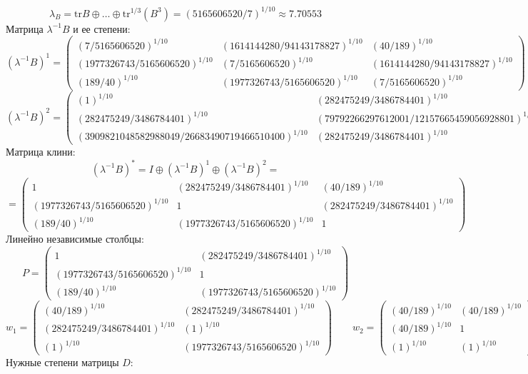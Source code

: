$$\lambda_{B} = \mathrm{tr}B\oplus \dots \oplus \mathrm{tr}^{1/3}(B^{3}) = (5165606520/7)^{1/10} \approx 7.70553$$
Матрица $\lambda^{-1}B$ и ее степени:
$$(\lambda^{-1}B)^1 = \begin{pmatrix}
(7/5165606520)^{1/10} & (1614144280/94143178827)^{1/10} & (40/189)^{1/10}\\
(1977326743/5165606520)^{1/10} & (7/5165606520)^{1/10} & (1614144280/94143178827)^{1/10}\\
(189/40)^{1/10} & (1977326743/5165606520)^{1/10} & (7/5165606520)^{1/10}
\end{pmatrix}
$$
$$(\lambda^{-1}B)^2 = \begin{pmatrix}
(1)^{1/10} & (282475249/3486784401)^{1/10} & (2605461756656718400/8862938119652501095929)^{1/10}\\
(282475249/3486784401)^{1/10} & (79792266297612001/12157665459056928801)^{1/10} & (282475249/3486784401)^{1/10}\\
(3909821048582988049/26683490719466510400)^{1/10} & (282475249/3486784401)^{1/10} & (1)^{1/10}
\end{pmatrix}
$$
Матрица клини:
$$(\lambda^{-1}B)^* = I \oplus (\lambda^{-1}B)^1 \oplus (\lambda^{-1}B)^2 = $$
$$ = \begin{pmatrix}
1 & (282475249/3486784401)^{1/10} & (40/189)^{1/10}\\
(1977326743/5165606520)^{1/10} & 1 & (282475249/3486784401)^{1/10}\\
(189/40)^{1/10} & (1977326743/5165606520)^{1/10} & 1
\end{pmatrix}
$$
Линейно независимые столбцы:
$$P = \begin{pmatrix}
1 & (282475249/3486784401)^{1/10}\\
(1977326743/5165606520)^{1/10} & 1\\
(189/40)^{1/10} & (1977326743/5165606520)^{1/10}
\end{pmatrix}
$$
$$w_1 = \begin{pmatrix}
(40/189)^{1/10} & (282475249/3486784401)^{1/10}\\
(282475249/3486784401)^{1/10} & (1)^{1/10}\\
(1)^{1/10} & (1977326743/5165606520)^{1/10}
\end{pmatrix}
\qquad w_2 = \begin{pmatrix}
(40/189)^{1/10} & (40/189)^{1/10}\\
(40/189)^{1/10} & 1\\
(1)^{1/10} & (1)^{1/10}
\end{pmatrix}
$$
Нужные степени матрицы $D$:
